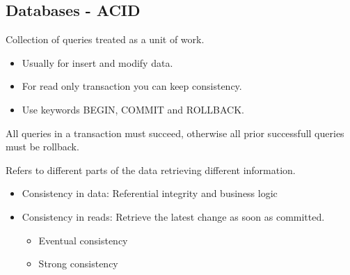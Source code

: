 \documentclass[../../main.tex]{subfiles}
\begin{document}
\subsection{Databases - ACID}
\begin{definition}[Transaction]
    Collection of queries treated as a unit of work.
    \begin{itemize}
        \item Usually for insert and modify data.
        \item For read only transaction you can keep consistency.
        \item Use keywords BEGIN, COMMIT and ROLLBACK.
    \end{itemize}
\end{definition}

\begin{definition}[Atomicity]
    All queries in a transaction must succeed, otherwise all prior successfull queries must be rollback.
\end{definition}

\begin{definition}[Consistency]
    Refers to different parts of the data retrieving different information.
    \begin{itemize}
        \item Consistency in data: Referential integrity and business logic
        \item Consistency in reads: Retrieve the latest change as soon as committed.
        \begin{itemize}
            \item Eventual consistency
            \item Strong consistency
        \end{itemize}
    \end{itemize}
\end{definition}
\end{document}
